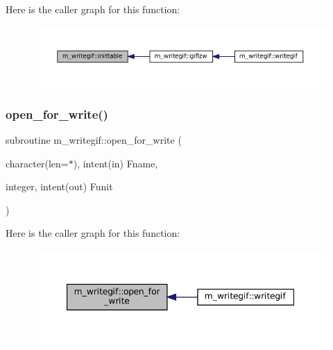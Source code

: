 Here is the caller graph for this function\+:
\nopagebreak
\begin{figure}[H]
\begin{center}
\leavevmode
\includegraphics[width=350pt]{namespacem__writegif_aed61b15f90188ddf39b71aa0c73a82a8_icgraph}
\end{center}
\end{figure}
\mbox{\label{namespacem__writegif_adb045213dd61508ad7dc7e5640fde67d}} 
\subsubsection{\texorpdfstring{open\+\_\+for\+\_\+write()}{open\_for\_write()}}
{\footnotesize\ttfamily subroutine m\+\_\+writegif\+::open\+\_\+for\+\_\+write (\begin{DoxyParamCaption}\item[{character(len=$\ast$), intent(in)}]{Fname,  }\item[{integer, intent(out)}]{Funit }\end{DoxyParamCaption})\hspace{0.3cm}{\ttfamily [private]}}

Here is the caller graph for this function\+:
\nopagebreak
\begin{figure}[H]
\begin{center}
\leavevmode
\includegraphics[width=347pt]{namespacem__writegif_adb045213dd61508ad7dc7e5640fde67d_icgraph}
\end{center}
\end{figure}
\mbox{\label{namespacem__writegif_a27e0ec2c6e05428641179bf35762adb7}} 
